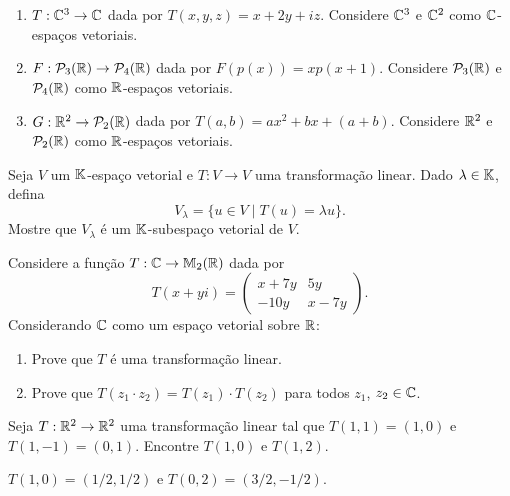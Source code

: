 \documentclass[12pt]{exam}
\begin{document}
\begin{exercicio}
\begin{enumerate}[label={\alph*})]
        \item $T : \mathbb{C}^3 \to \mathbb{C}$ dada por $T(x,y,z) = x + 2y + iz$. Considere $\mathbb{C}^3$ e $\mathbb{C}^2$ como $\mathbb{C}$-espaços vetoriais.

        \item $F : \mathcal{P}_3(\mathbb{R}) \to \mathcal{P}_4(\mathbb{R})$ dada por $F(p(x)) = xp(x + 1)$. Considere $\mathcal{P}_3(\mathbb{R})$ e $\mathcal{P}_4(\mathbb{R})$ como $\mathbb{R}$-espaços vetoriais.

        \item $G : \mathbb{R}^2 \to \mathcal{P}_2(\mathbb{R})$ dada por $T(a,b) = ax^2 + bx + (a + b)$. Considere $\mathbb{R}^2$ e $\mathcal{P}_2(\mathbb{R})$ como $\mathbb{R}$-espaços vetoriais.
    \end{enumerate}
\end{exercicio}

\begin{exercicio}
    Seja $V$ um $\mathbb{K}$-espaço vetorial e $T : V \to V$ uma transformação linear. Dado $\lambda \in \mathbb{K}$, defina
    \[
        V_\lambda = \{ u \in V \mid T(u) = \lambda u\}.
    \]
    Mostre que $V_\lambda$ é um $\mathbb{K}$-subespaço vetorial de $V$.
\end{exercicio}

\begin{exercicio}
    Considere a função $T : \mathbb{C} \to \mathbb{M}_2(\mathbb{R})$ dada por
    \[
        T(x + yi) = \begin{pmatrix}
                        x + 7y & 5y\\
                       -10y & x - 7y
                   \end{pmatrix}.
    \]
    Considerando $\mathbb{C}$ como um espaço vetorial sobre $\mathbb{R}$:
    \begin{enumerate}[label={\alph*})]
        \item Prove que $T$ é uma transformação linear.

        \item Prove que $T(z_1\cdot z_2) = T(z_1)\cdot T(z_2)$ para todos $z_1$, $z_2 \in \mathbb{C}$.
    \end{enumerate}
\end{exercicio}

\begin{exercicio}
    Seja $T : \mathbb{R}^2 \to \mathbb{R}^2$ uma transformação linear tal que $T(1,1) = (1,0)$ e $T(1,-1) = (0,1)$. Encontre $T(1,0)$ e $T(1,2)$.
    \begin{solucao}
        $T(1,0) = (1/2,1/2)$ e $T(0,2) = (3/2,-1/2)$.
    \end{solucao}
\end{exercicio}
\end{document}
